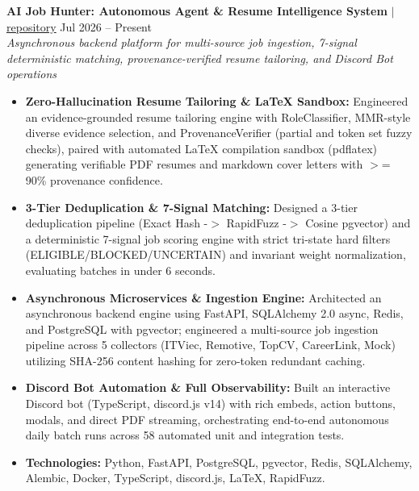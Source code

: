 \documentclass[10pt,a4paper]{article}
\begin{document}
\noindent \textbf{AI Job Hunter: Autonomous Agent \& Resume Intelligence System} $|$ \href{https://github.com/vyquochuy/Discord-Job-hunt}{repository} \hfill Jul 2026 -- Present\\
\textit{Asynchronous backend platform for multi-source job ingestion, 7-signal deterministic matching, provenance-verified resume tailoring, and Discord Bot operations}
\begin{itemize}[leftmargin=0.25in, nosep]
    \item \textbf{Zero-Hallucination Resume Tailoring \& LaTeX Sandbox:} Engineered an evidence-grounded resume tailoring engine with RoleClassifier, MMR-style diverse evidence selection, and ProvenanceVerifier (partial and token set fuzzy checks), paired with automated LaTeX compilation sandbox (pdflatex) generating verifiable PDF resumes and markdown cover letters with $>$= 90\% provenance confidence.
    \item \textbf{3-Tier Deduplication \& 7-Signal Matching:} Designed a 3-tier deduplication pipeline (Exact Hash -$>$ RapidFuzz -$>$ Cosine pgvector) and a deterministic 7-signal job scoring engine with strict tri-state hard filters (ELIGIBLE/BLOCKED/UNCERTAIN) and invariant weight normalization, evaluating batches in under 6 seconds.
    \item \textbf{Asynchronous Microservices \& Ingestion Engine:} Architected an asynchronous backend engine using FastAPI, SQLAlchemy 2.0 async, Redis, and PostgreSQL with pgvector; engineered a multi-source job ingestion pipeline across 5 collectors (ITViec, Remotive, TopCV, CareerLink, Mock) utilizing SHA-256 content hashing for zero-token redundant caching.
    \item \textbf{Discord Bot Automation \& Full Observability:} Built an interactive Discord bot (TypeScript, discord.js v14) with rich embeds, action buttons, modals, and direct PDF streaming, orchestrating end-to-end autonomous daily batch runs across 58 automated unit and integration tests.
    \item \textbf{Technologies:} Python, FastAPI, PostgreSQL, pgvector, Redis, SQLAlchemy, Alembic, Docker, TypeScript, discord.js, LaTeX, RapidFuzz.
\end{itemize}
\vspace{10pt}
\end{document}
